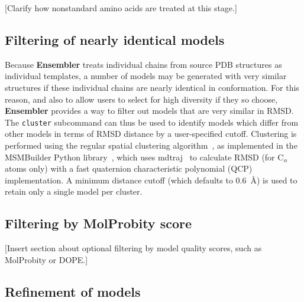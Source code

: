 \documentclass[aps,pre,twocolumn,nofootinbib,superscriptaddress,linenumbers]{revtex4-1}
\begin{document}
\color{orange}
[Clarify how nonstandard amino acids are treated at this stage.]
\color{black}

\subsection*{Filtering of nearly identical models}

Because {\bf Ensembler} treats individual chains from source PDB structures as individual templates, a number of models may be generated with very similar structures if these individual chains are nearly identical in conformation.
For this reason, and also to allow users to select for high diversity if they so choose, {\bf Ensembler} provides a way to filter out models that are very similar in RMSD.
The {\tt cluster} subcommand can thus be used to identify models which differ from other models in terms of RMSD distance by a user-specified cutoff.
Clustering is performed using the regular spatial clustering algorithm~\cite{noe:jcp:2011:msm-review}, as implemented in the MSMBuilder Python library~\cite{msmbuilder}, which uses mdtraj~\cite{mdtraj} to calculate RMSD (for C$_\alpha$ atoms only) with a fast quaternion characteristic polynomial (QCP)~\cite{theobald:acta-cryst-a:2005:qcp,theobald:j-comput-chem:2010:qcp,theobald:j-comput-chem:2011:qcp} implementation.
A minimum distance cutoff (which defaults to 0.6~\AA) is used to retain only a single model per cluster.

\subsection*{{\color{red} Filtering by MolProbity score}}

\color{orange}
[Insert section about optional filtering by model quality scores, such as MolProbity or DOPE.]
\color{black}

\subsection{Refinement of models}
\end{document}

